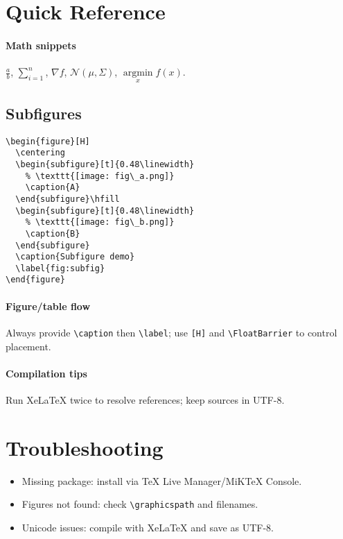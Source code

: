 \documentclass[11pt]{article}
\begin{document}
\section{Quick Reference}
\paragraph{Math snippets} $\frac{a}{b}$, $\sum_{i=1}^n$, $\nabla f$, $\mathcal{N}(\mu,\Sigma)$, $\operatorname*{argmin}\limits_x f(x)$.

\subsection{Subfigures}
\begin{lstlisting}[style=code,caption={Subfigures (needs subcaption)}]
\begin{figure}[H]
  \centering
  \begin{subfigure}[t]{0.48\linewidth}
    % \texttt{[image: fig\_a.png]}
    \caption{A}
  \end{subfigure}\hfill
  \begin{subfigure}[t]{0.48\linewidth}
    % \texttt{[image: fig\_b.png]}
    \caption{B}
  \end{subfigure}
  \caption{Subfigure demo}
  \label{fig:subfig}
\end{figure}
\end{lstlisting}
\paragraph{Figure/table flow} Always provide \verb|\caption| then \verb|\label|; use \verb|[H]| and \verb|\FloatBarrier| to control placement.

\paragraph{Compilation tips} Run XeLaTeX twice to resolve references; keep sources in UTF-8.

\section{Troubleshooting}
\begin{itemize}
  \item Missing package: install via TeX Live Manager/MiKTeX Console.
  \item Figures not found: check \verb|\graphicspath| and filenames.
  \item Unicode issues: compile with XeLaTeX and save as UTF-8.
\end{itemize}
\end{document}
